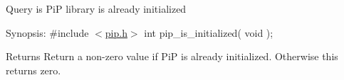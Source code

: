 Query is Pi\-P library is already initialized

\begin{DoxyParagraph}{Synopsis\-:}
\#include $<$\hyperlink{pip_8h_source}{pip.\-h}$>$ int pip\-\_\-is\-\_\-initialized( void );
\end{DoxyParagraph}
\begin{DoxyReturn}{Returns}
Return a non-\/zero value if Pi\-P is already initialized. Otherwise this returns zero. 
\end{DoxyReturn}
